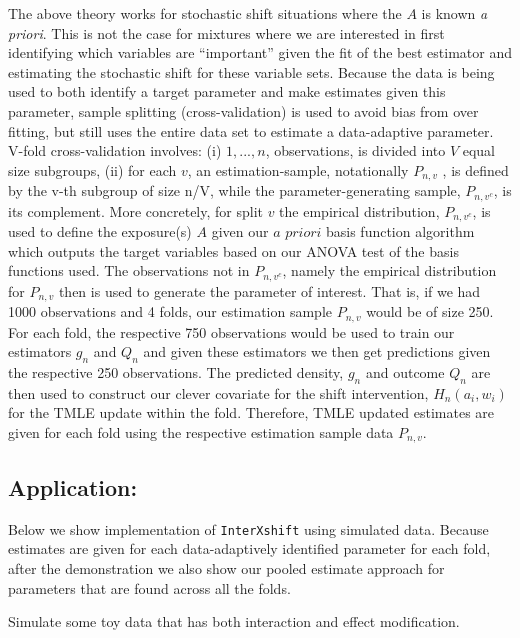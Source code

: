 \documentclass[
]{article}
\begin{document}
The above theory works for stochastic shift situations where the \(A\)
is known \textit{a priori}. This is not the case for mixtures where we
are interested in first identifying which variables are ``important''
given the fit of the best estimator and estimating the stochastic shift
for these variable sets. Because the data is being used to both identify
a target parameter and make estimates given this parameter, sample
splitting (cross-validation) is used to avoid bias from over fitting,
but still uses the entire data set to estimate a data-adaptive
parameter. V-fold cross-validation involves: (i) \({1,..., n}\),
observations, is divided into \(V\) equal size subgroups, (ii) for each
\(v\), an estimation-sample, notationally \(P_{n,v}\) , is defined by
the v-th subgroup of size n/V, while the parameter-generating sample,
\(P_{n,v^c}\), is its complement. More concretely, for split \(v\) the
empirical distribution, \(P_{n,v^c}\), is used to define the exposure(s)
\(A\) given our \(\textit{a priori}\) basis function algorithm which
outputs the target variables based on our ANOVA test of the basis
functions used. The observations not in \(P_{n,v^c}\), namely the
empirical distribution for \(P_{n,v}\) then is used to generate the
parameter of interest. That is, if we had 1000 observations and 4 folds,
our estimation sample \(P_{n,v}\) would be of size 250. For each fold,
the respective 750 observations would be used to train our estimators
\(g_n\) and \(Q_n\) and given these estimators we then get predictions
given the respective 250 observations. The predicted density, \(g_n\)
and outcome \(Q_n\) are then used to construct our clever covariate for
the shift intervention, \(H_n(a_i, w_i)\) for the TMLE update within the
fold. Therefore, TMLE updated estimates are given for each fold using
the respective estimation sample data \(P_{n,v}\).

\hypertarget{application}{%
\subsection{Application:}\label{application}}

Below we show implementation of \texttt{InterXshift} using simulated data.
Because estimates are given for each data-adaptively identified
parameter for each fold, after the demonstration we also show our pooled
estimate approach for parameters that are found across all the folds.

Simulate some toy data that has both interaction and effect
modification.
\end{document}
